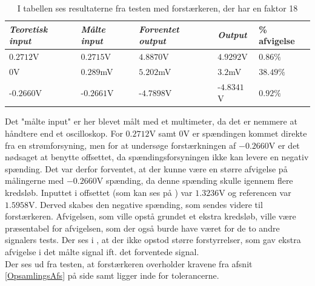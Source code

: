 \begin{table}[H]
	\centering
	\begin{tabular}{|l|l|l|l|l|}
		\hline
		\textit{Teoretisk input} & \textit{Målte input} & \textit{Forventet output} & \textit{Output} & \% afvigelse \\ \hline
		$0.2712$V   & $0.2715$V    & $4.8870$V     & $4.9292$V       & $0.86\%$     \\ \hline
		$0$V        & $0.289$mV    & $5.202$mV          & $3.2$mV         & $38.49\%$      \\ \hline
		-$0.2660$V  & -$0.2661$V   & -$4.7898$V    & -$4.8341$V      & $0.92\%$     \\ \hline
	\end{tabular}
	\caption{I tabellen ses resultaterne fra testen med forstærkeren, der har en faktor 18}
	\label{Tab:faktor18_test}
\end{table}
Det "målte input" er her blevet målt med et multimeter, da det er nemmere at håndtere end et oscilloskop. For $0.2712$V samt $0$V er spændingen kommet direkte fra en strømforsyning, men for at undersøge forstærkningen af $-0.2660$V er det nødsaget at benytte offsettet, da spændingsforsyningen ikke kan levere en negativ spænding. Det var derfor forventet, at der kunne være en større afvigelse på målingerne med $-0.2660$V spænding, da denne spænding skulle igennem flere kredsløb. Inputtet i offsettet (som kan ses på ) var $1.3236$V og referencen var $1.5958$V. Derved skabes den negative spænding, som sendes videre til forstærkeren. Afvigelsen, som ville opstå grundet et ekstra kredsløb, ville være præsentabel for afvigelsen, som der også burde have været for de to andre signalers tests. Der ses i , at der ikke opstod større forstyrrelser, som gav ekstra afvigelse i det målte signal ift. det forventede signal. \\
Der ses ud fra testen, at forstærkeren overholder kravene fra afsnit \ref{OpsamlingsAfs} på side \pageref{OpsamlingsAfs} samt ligger inde for tolerancerne.
